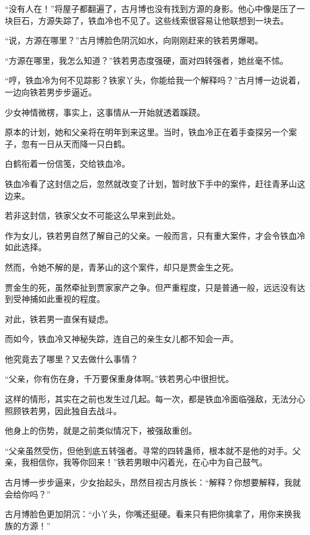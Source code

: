 
\begin{this_body}



“没有人在！”将屋子都翻遍了，古月博也没有找到方源的身影。他心中像是压了一块巨石，方源失踪了，铁血冷也不见了。这些线索很容易让他联想到一块去。

“说，方源在哪里？”古月博脸色阴沉如水，向刚刚赶来的铁若男爆喝。

“方源在哪里，我怎么知道？”铁若男态度强硬，面对四转强者，她丝毫不怵。

“哼，铁血冷为何不见踪影？铁家丫头，你能给我一个解释吗？”古月博一边说着，一边向铁若男步步逼近。

少女神情微楞，事实上，这事情从一开始就透着蹊跷。

原本的计划，她和父亲将在明年到来这里。当时，铁血冷正在着手查探另一个案子，忽有一日从天而降一只白鹤。

白鹤衔着一份信笺，交给铁血冷。

铁血冷看了这封信之后，忽然就改变了计划，暂时放下手中的案件，赶往青茅山这边来。

若非这封信，铁家父女不可能这么早来到此处。

作为女儿，铁若男自然了解自己的父亲。一般而言，只有重大案件，才会令铁血冷如此选择。

然而，令她不解的是，青茅山的这个案件，却只是贾金生之死。

贾金生的死，虽然牵扯到贾家家产之争。但严重程度，只是普通一般，远远没有达到受神捕如此重视的程度。

对此，铁若男一直保有疑虑。

而如今，铁血冷又神秘失踪，连自己的亲生女儿都不知会一声。

他究竟去了哪里？又去做什么事情？

“父亲，你有伤在身，千万要保重身体啊。”铁若男心中很担忧。

这样的情形，其实在之前也发生过几起。每一次，都是铁血冷面临强敌，无法分心照顾铁若男，因此独自去战斗。

他身上的伤势，就是之前类似情况下，被强敌重创。

“父亲虽然受伤，但他到底五转强者。寻常的四转蛊师，根本就不是他的对手。父亲，我相信你，我等你回来！”铁若男眼中闪着光，在心中为自己鼓气。

古月博一步步逼来，少女抬起头，昂然目视古月族长：“解释？你想要解释，我就会给你吗？”

古月博脸色更加阴沉：“小丫头，你嘴还挺硬。看来只有把你擒拿了，用你来换我族的方源！”


\end{this_body}
